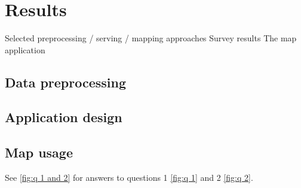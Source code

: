 \section{Results}
Selected preprocessing / serving / mapping approaches
Survey results
The map application

\subsection{Data preprocessing}

\subsection{Application design}

\subsection{Map usage}

See \ref{fig:q 1 and 2} for answers to questions 1 \ref{fig:q 1} and 2 \ref{fig:q 2}.

